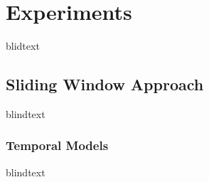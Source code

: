 \chapter{Experiments}
\label{sec:experiments}


blidtext










\section{Sliding Window Approach}
blindtext

\subsection{Temporal Models}
blindtext